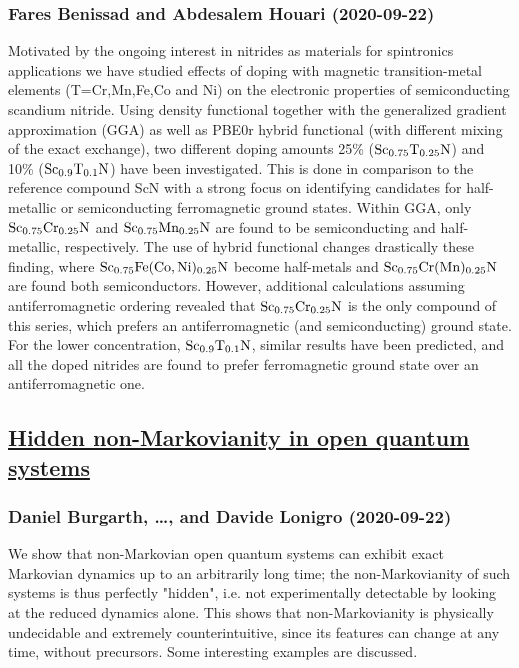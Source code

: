 {\subsubsection*{Fares Benissad and Abdesalem Houari (2020-09-22)}
Motivated by the ongoing interest in nitrides as materials for spintronics
applications we have studied effects of doping with magnetic transition-metal
elements (T=Cr,Mn,Fe,Co and Ni) on the electronic properties of semiconducting
scandium nitride. Using density functional together with the generalized
gradient approximation (GGA) as well as PBE0r hybrid functional (with different
mixing of the exact exchange), two different doping amounts 25\% ($\rm
Sc_{0.75}T_{0.25}N$) and 10\% ($\rm Sc_{0.9}T_{0.1}N$) have been investigated.
This is done in comparison to the reference compound ScN with a strong focus on
identifying candidates for half-metallic or semiconducting ferromagnetic ground
states. Within GGA, only $\rm Sc_{0.75}Cr_{0.25}N$ and $\rm
Sc_{0.75}Mn_{0.25}N$ are found to be semiconducting and half-metallic,
respectively. The use of hybrid functional changes drastically these finding,
where $\rm Sc_{0.75}Fe(Co,Ni)_{0.25}N$ become half-metals and $\rm
Sc_{0.75}Cr(Mn)_{0.25}N$ are found both semiconductors. However, additional
calculations assuming antiferromagnetic ordering revealed that $\rm
Sc_{0.75}Cr_{0.25}N$ is the only compound of this series, which prefers an
antiferromagnetic (and semiconducting) ground state. For the lower
concentration, $\rm Sc_{0.9}T_{0.1}N$, similar results have been predicted, and
all the doped nitrides are found to prefer ferromagnetic ground state over an
antiferromagnetic one.

\subsection*{\href{http://arxiv.org/abs/2009.10605v1}{Hidden non-Markovianity in open quantum systems}}
\subsubsection*{Daniel Burgarth, \dots, and Davide Lonigro (2020-09-22)}
We show that non-Markovian open quantum systems can exhibit exact Markovian
dynamics up to an arbitrarily long time; the non-Markovianity of such systems
is thus perfectly "hidden", i.e. not experimentally detectable by looking at
the reduced dynamics alone. This shows that non-Markovianity is physically
undecidable and extremely counterintuitive, since its features can change at
any time, without precursors. Some interesting examples are discussed.

}
